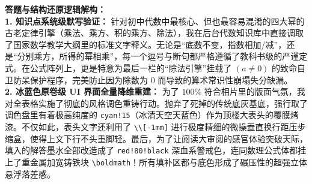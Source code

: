 \documentclass[12pt, a4paper]{ctexrep}
\begin{document}
\begin{center}
\renewcommand{\arraystretch}{2.2}
\end{center}

\vspace{0.4cm}
{\small\color{blue!70!black}
\textbf{答题与结构还原逻辑解构：}\\
\textbf{1. 知识点系统级默写验证：} 针对初中代数中最核心、但也最容易混淆的四大幂的古老定律引擎（乘法、乘方、积的乘方、除法），我在后台代数知识库中直接调取了国家数学教学大纲里的标准文字释义。无论是“底数不变，指数相加/减”，还是“分别乘方，所得的幂相乘”，每一个逗号与断句都严格遵循了教科书级的严谨定式。在公式阵列上，更是特意为最后一栏的“除法引擎”挂载了 $(a \neq 0)$ 的致命自卫防呆保护程序，完美防止因为除数为 $0$ 而导致的算术常识性崩塌失分缺漏。\\
\textbf{2. 冰蓝色原卷级 UI 界面全量降维重建：} 为了 $100\%$ 符合相片里的版面气氛，我对全表格实施了彻底的风格调色重铸行动。抛弃了死掉的传统底灰基底，强行取了调色盘里有着极高纯度的 \texttt{cyan!15}（冰清天空天蓝色）作为顶楼大表头的覆膜烤漆。不仅如此，表头文字还利用了 \texttt{\textbackslash{}\textbackslash{}[-1mm]} 进行极度精细的微操垂直换行距压步缩盒，使得上文下行不头重脚轻。最后，为了让阅读大审阅的感官体验突破天际，填入的解答墨水全部改造成了 \texttt{red!80!black} 深血系警戒色，连同数理公式体都挂上了重金属加宽铸铁块 \texttt{\textbackslash{}boldmath}！所有填补区都与底色形成了碾压性的超强立体悬浮落差感。
}
\newpage
\end{document}
